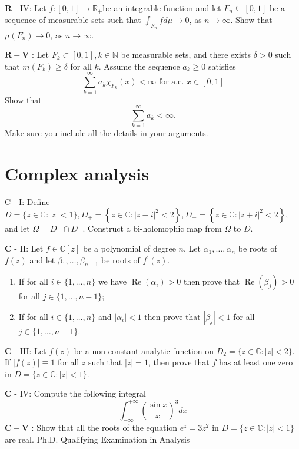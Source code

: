 \documentclass[10pt]{article}
\begin{document}
$\mathbf{R}$ - IV: Let $f:[0,1] \rightarrow \mathbb{R}_{+}$be an integrable function and let $F_{n} \subseteq[0,1]$ be a sequence of measurable sets such that $\int_{F_{n}} f d \mu \rightarrow 0$, as $n \rightarrow \infty$. Show that $\mu\left(F_{n}\right) \rightarrow 0$, as $n \rightarrow \infty$.

$\mathbf{R}-\mathbf{V}$ : Let $F_{k} \subset[0,1], k \in \mathbb{N}$ be measurable sets, and there exists $\delta>0$ such that $m\left(F_{k}\right) \geq \delta$ for all $k$. Assume the sequence $a_{k} \geq 0$ satisfies
$$
\sum_{k=1}^{\infty} a_{k} \chi_{F_{k}}(x)<\infty \text { for a.e. } x \in[0,1]
$$
Show that
$$
\sum_{k=1}^{\infty} a_{k}<\infty .
$$
Make sure you include all the details in your arguments.

\section{Complex analysis}
C - I: Define $D=\{z \in \mathbb{C}:|z|<1\}, D_{+}=\left\{z \in \mathbb{C}:|z-i|^{2}<2\right\}, D_{-}=\left\{z \in \mathbb{C}:|z+i|^{2}<2\right\}$, and let $\Omega=D_{+} \cap D_{-}$. Construct a bi-holomophic map from $\Omega$ to $D$.

$\mathbf{C}$ - II: Let $f \in \mathbb{C}[z]$ be a polynomial of degree $n$. Let $\alpha_{1}, \ldots, \alpha_{n}$ be roots of $f(z)$ and let $\beta_{1}, \ldots, \beta_{n-1}$ be roots of $f^{\prime}(z)$.

\begin{enumerate}
  \item If for all $i \in\{1, \ldots, n\}$ we have $\operatorname{Re}\left(\alpha_{i}\right)>0$ then prove that $\operatorname{Re}\left(\beta_{j}\right)>0$ for all $j \in\{1, \ldots, n-1\}$;

  \item If for all $i \in\{1, \ldots, n\}$ and $\left|\alpha_{i}\right|<1$ then prove that $\left|\beta_{j}\right|<1$ for all $j \in\{1, \ldots, n-1\}$.

\end{enumerate}
$\mathbf{C}$ - III: Let $f(z)$ be a non-constant analytic function on $D_{2}=\{z \in \mathbb{C}:|z|<2\}$. If $|f(z)| \equiv 1$ for all $z$ such that $|z|=1$, then prove that $f$ has at least one zero in $D=\{z \in \mathbb{C}:|z|<1\}$.

$\mathbf{C}$ - IV: Compute the following integral
$$
\int_{-\infty}^{+\infty}\left(\frac{\sin x}{x}\right)^{3} d x
$$
$\mathbf{C}-\mathbf{V}$ : Show that all the roots of the equation $e^{z}=3 z^{2}$ in $D=\{z \in \mathbb{C}:|z|<1\}$ are real. Ph.D. Qualifying Examination in Analysis
\end{document}
